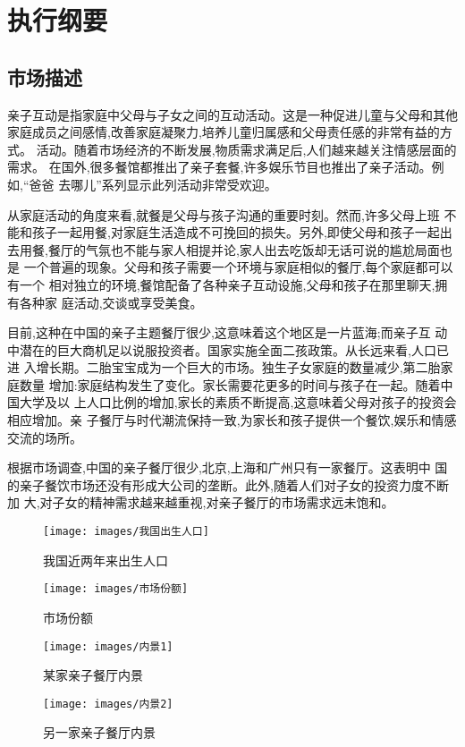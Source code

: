 \chapter{执行纲要}

\section{市场描述}
亲子互动是指家庭中父母与子女之间的互动活动。这是一种促进儿童与父母和其他
家庭成员之间感情,改善家庭凝聚力,培养儿童归属感和父母责任感的非常有益的方式。
活动。随着市场经济的不断发展,物质需求满足后,人们越来越关注情感层面的需求。
在国外,很多餐馆都推出了亲子套餐,许多娱乐节目也推出了亲子活动。例如,“爸爸
去哪儿”系列显示此列活动非常受欢迎。

从家庭活动的角度来看,就餐是父母与孩子沟通的重要时刻。然而,许多父母上班
不能和孩子一起用餐,对家庭生活造成不可挽回的损失。另外,即使父母和孩子一起出
去用餐,餐厅的气氛也不能与家人相提并论,家人出去吃饭却无话可说的尴尬局面也是
一个普遍的现象。父母和孩子需要一个环境与家庭相似的餐厅,每个家庭都可以有一个
相对独立的环境,餐馆配备了各种亲子互动设施,父母和孩子在那里聊天,拥有各种家
庭活动,交谈或享受美食。

目前,这种在中国的亲子主题餐厅很少,这意味着这个地区是一片蓝海;而亲子互
动中潜在的巨大商机足以说服投资者。国家实施全面二孩政策。从长远来看,人口已进
入增长期。二胎宝宝成为一个巨大的市场。独生子女家庭的数量减少,第二胎家庭数量
增加:家庭结构发生了变化。家长需要花更多的时间与孩子在一起。随着中国大学及以
上人口比例的增加,家长的素质不断提高,这意味着父母对孩子的投资会相应增加。亲
子餐厅与时代潮流保持一致,为家长和孩子提供一个餐饮,娱乐和情感交流的场所。

根据市场调查,中国的亲子餐厅很少,北京,上海和广州只有一家餐厅。这表明中
国的亲子餐饮市场还没有形成大公司的垄断。此外,随着人们对子女的投资力度不断加
大,对子女的精神需求越来越重视,对亲子餐厅的市场需求远未饱和。

\begin{figure}[ htbp ]
        \centering
        \texttt{[image: images/我国出生人口]}
        \caption{我国近两年来出生人口}
        \label{fig:population}
\end{figure}
\begin{figure}[ htbp ]
        \centering
        \texttt{[image: images/市场份额]}
        \caption{市场份额}
        \label{fig:market-share}
\end{figure}
\begin{figure}[ htbp ]
        \centering
        \texttt{[image: images/内景1]}
        \caption{某家亲子餐厅内景}
\end{figure}
\begin{figure}[ htbp ]
        \centering
        \texttt{[image: images/内景2]}
        \caption{另一家亲子餐厅内景}
\end{figure}

